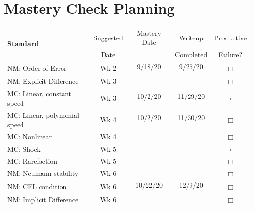 \documentclass{article}
\newcommand{\checked}{\makebox[0pt][l]{$\checkmark$}$\square$}
\newcommand{\unchecked}{$\Box$}
\begin{document}
\section{Mastery Check Planning}
\begin{tabular}{|l|c|c|c|c} \cline{1-4}
\multirow{2}{5cm}{\textbf{Standard}} & Suggested & Mastery Date & Writeup & Productive  \\ 
& Date & & Completed & Failure? \\ \cline{1-4}
\multirow{2}{5cm}{NM: Order of Error} & \multirow{2}{1.5cm}{Wk 2} & 9/18/20 & 9/26/20 & \multirow{2}{.4cm}{\unchecked} \\ &&&& \\ \cline{1-4}
\multirow{2}{5cm}{NM: Explicit Difference} & \multirow{2}{1.5cm}{Wk 3} &     &           & \multirow{2}{.4cm}{\unchecked} \\ &&&& \\ \cline{1-4}
\multirow{2}{5cm}{MC: Linear, constant speed}  & \multirow{2}{1.5cm}{Wk 3} & 10/2/20 & 11/29/20 & \multirow{2}{.4cm}{\checked} \\ &&&& \\ \cline{1-4}
\multirow{2}{5cm}{MC: Linear, polynomial speed} & \multirow{2}{1.5cm}{Wk 4} & 10/2/20 & 11/30/20 & \multirow{2}{.4cm}{\unchecked} \\ &&&& \\ \cline{1-4}
\multirow{2}{5cm}{MC: Nonlinear} &\multirow{2}{1.5cm}{Wk 4}&&& \multirow{2}{.4cm}{\unchecked} \\ &&&& \\ \cline{1-4}
\multirow{2}{5cm}{MC: Shock} &\multirow{2}{1.5cm}{Wk 5}&      &           & \multirow{2}{.4cm}{\checked} \\ &&&& \\ \cline{1-4}
\multirow{2}{5cm}{MC: Rarefaction} & \multirow{2}{1.5cm}{Wk 5}&      &         &  \multirow{2}{.4cm}{\unchecked} \\ &&&& \\ \cline{1-4}
\multirow{2}{5cm}{NM: Neumann stability} &\multirow{2}{1.5cm}{Wk 6}&&& \multirow{2}{.4cm}{\unchecked} \\ &&&& \\ \cline{1-4}
\multirow{2}{5cm}{NM: CFL condition} &\multirow{2}{1.5cm}{Wk 6} & 10/22/20 & 12/9/20 &  \multirow{2}{.4cm}{\unchecked} \\ &&&& \\ \cline{1-4}
\multirow{2}{5cm}{NM: Implicit Difference} &\multirow{2}{1.5cm}{Wk 6}&&& \multirow{2}{.4cm}{\unchecked} \\ &&&& \\ \cline{1-4}

\end{tabular}
\end{document}
